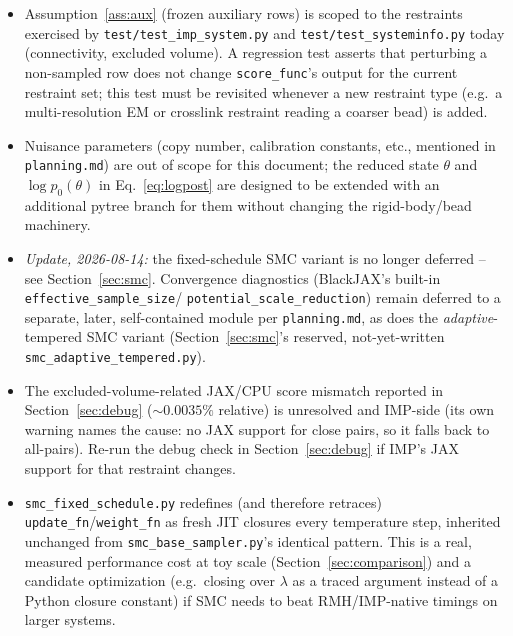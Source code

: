 \documentclass[11pt]{article}
\begin{document}
\begin{itemize}
  \item Assumption~\ref{ass:aux} (frozen auxiliary rows) is scoped to the
    restraints exercised by \texttt{test/test\_imp\_system.py} and
    \texttt{test/test\_systeminfo.py} today (connectivity, excluded volume).
    A regression test asserts that perturbing a non-sampled row does not
    change \texttt{score\_func}'s output for the current restraint set; this
    test must be revisited whenever a new restraint type (e.g.\ a multi-resolution
    EM or crosslink restraint reading a coarser bead) is added.
  \item Nuisance parameters (copy number, calibration constants, etc.,
    mentioned in \texttt{planning.md}) are out of scope for this document;
    the reduced state $\theta$ and $\log p_0(\theta)$ in
    Eq.~\eqref{eq:logpost} are designed to be extended with an additional
    pytree branch for them without changing the rigid-body/bead machinery.
  \item \emph{Update, 2026-08-14:} the fixed-schedule SMC variant is no
    longer deferred -- see Section~\ref{sec:smc}. Convergence diagnostics
    (BlackJAX's built-in \texttt{effective\_sample\_size}/
    \texttt{potential\_scale\_reduction}) remain deferred to a separate,
    later, self-contained module per \texttt{planning.md}, as does the
    \emph{adaptive}-tempered SMC variant (Section~\ref{sec:smc}'s
    reserved, not-yet-written \texttt{smc\_adaptive\_tempered.py}).
  \item The excluded-volume-related JAX/CPU score mismatch reported in
    Section~\ref{sec:debug} ($\sim 0.0035\%$ relative) is unresolved and
    IMP-side (its own warning names the cause: no JAX support for close
    pairs, so it falls back to all-pairs). Re-run the debug check in
    Section~\ref{sec:debug} if IMP's JAX support for that restraint changes.
  \item \texttt{smc\_fixed\_schedule.py} redefines (and therefore retraces)
    \texttt{update\_fn}/\texttt{weight\_fn} as fresh JIT closures every
    temperature step, inherited unchanged from
    \texttt{smc\_base\_sampler.py}'s identical pattern. This is a real,
    measured performance cost at toy scale (Section~\ref{sec:comparison})
    and a candidate optimization (e.g.\ closing over $\lambda$ as a traced
    argument instead of a Python closure constant) if SMC needs to beat
    RMH/IMP-native timings on larger systems.
\end{itemize}
\end{document}
